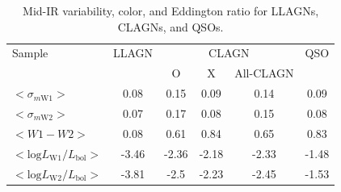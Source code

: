 \documentclass[linenumbers]{aastex631}
\begin{document}
\begin{table}
 \caption{Mid-IR variability, color, and Eddington ratio for LLAGNs, CLAGNs, and QSOs.
}
 \label{table_MIR_var_cor_lum}
 \begin{center}
 \begin{tabular}{lccccc}
 \hline\hline
Sample             & LLAGN &   \multicolumn{3}{c}{CLAGN}        & QSO  \\ 
                   &        &   O & X   & All-CLAGN         &       \\ \hline
$<\sigma_{m \mathrm{W1}}>$    &  0.08      & 0.15    &  0.09  &   0.14   &   0.09  \\ 
$<\sigma_{m \mathrm{W2}}>$    &  0.07      &   0.17 &  0.08   &    0.15  &   0.08    \\ 
$<W1-W2>$          &   0.08      &  0.61   & 0.84      &    0.65    &   0.83   \\ 
$<\mathrm{log} L_\mathrm{W1}/L_\mathrm{bol}>$ & -3.46  &  -2.36  &  -2.18   &  -2.33   &  -1.48\\ 
$<\mathrm{log} L_\mathrm{W2}/L_\mathrm{bol}>$ & -3.81  &   -2.5   &  -2.23   &  -2.45   &   -1.53  \\  
\hline\hline
\end{tabular}
\end{center}
\end{table}
\end{document}
